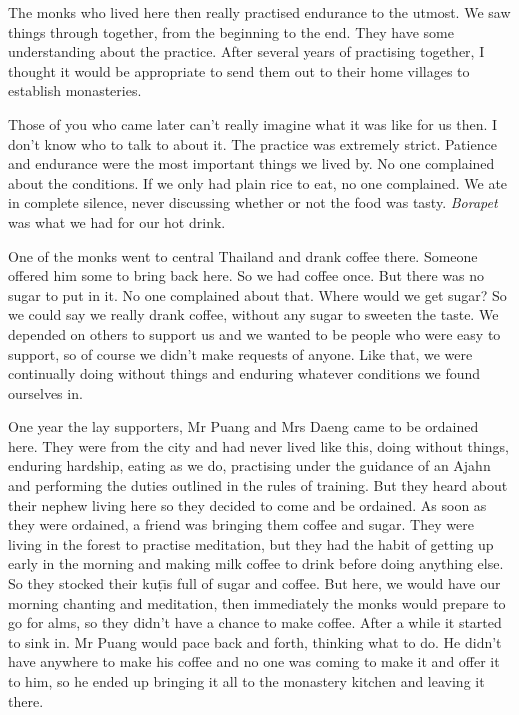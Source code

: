 The monks who lived here then really practised endurance to the utmost. We saw things through together, from the beginning to the end. They have some understanding about the practice. After several years of practising together, I thought it would be appropriate to send them out to their home villages to establish monasteries. 

Those of you who came later can't really imagine what it was like for us then. I don't know who to talk to about it. The practice was extremely strict. Patience and endurance were the most important things we lived by. No one complained about the conditions. If we only had plain rice to eat, no one complained. We ate in complete silence, never discussing whether or not the food was tasty. \textit{Borapet} was what we had for our hot drink. 

One of the monks went to central Thailand and drank coffee there. Some\-one offered him some to bring back here. So we had coffee once. But there was no sugar to put in it. No one complained about that. Where would we get sugar? So we could say we really drank coffee, without any sugar to sweeten the taste. We depended on others to support us and we wanted to be people who were easy to support, so of course we didn't make requests of anyone. Like that, we were continually doing without things and enduring whatever conditions we found ourselves in. 

One year the lay supporters, Mr Puang and Mrs Daeng came to be ordained here. They were from the city and had never lived like this, doing without things, enduring hardship, eating as we do, practising under the guidance of an Ajahn and performing the duties outlined in the rules of training. But they heard about their nephew living here so they decided to come and be ordained. As soon as they were ordained, a friend was bringing them coffee and sugar. They were living in the forest to practise meditation, but they had the habit of getting up early in the morning and making milk coffee to drink before doing anything else. So they stocked their ku\d{t}\={\i}s full of sugar and coffee. But here, we would have our morning chanting and meditation, then immediately the monks would prepare to go for alms, so they didn't have a chance to make coffee. After a while it started to sink in. Mr Puang would pace back and forth, thinking what to do. He didn't have anywhere to make his coffee and no one was coming to make it and offer it to him, so he ended up bringing it all to the monastery kitchen and leaving it there. 

